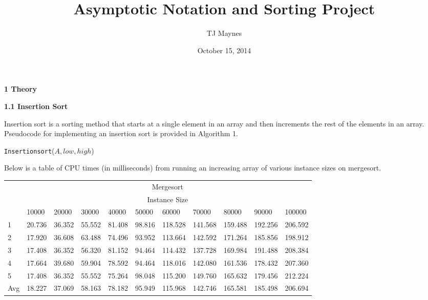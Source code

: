 \documentclass[12pt]{article}
\begin{document}
\title{Asymptotic Notation and Sorting Project}
\author{TJ Maynes}
\date{October 15, 2014}

\maketitle

\textbf{1 Theory}

\vspace{0.2in}
\textbf{1.1 Insertion Sort}

Insertion sort is a sorting method that starts at a single element in an array and then increments the rest of the elements in an array. Pseudocode for implementing an insertion sort is provided in Algorithm 1.

\begin{algorithm}
  \caption{\texttt{Insertionsort}($A,low,high$)}
\end{algorithm}

Below is a table of CPU times (in milliseconds) from running an increasing array of various instance sizes on mergesort. \\

\begin{table}[H]
  \begin{tabular}{lllllllllll}
    & \multicolumn{10}{c}{Mergesort}                                                               \\
    & \multicolumn{10}{c}{Instance Size}                                                           \\
    & 10000  & 20000  & 30000  & 40000  & 50000  & 60000   & 70000   & 80000   & 90000   & 100000  \\
    1   & 20.736 & 36.352 & 55.552 & 81.408 & 98.816 & 118.528 & 141.568 & 159.488 & 192.256 & 206.592 \\
    2   & 17.920 & 36.608 & 63.488 & 74.496 & 93.952 & 113.664 & 142.592 & 171.264 & 185.856 & 198.912 \\
    3   & 17.408 & 36.352 & 56.320 & 81.152 & 94.464 & 114.432 & 137.728 & 169.984 & 191.488 & 208.384 \\
    4   & 17.664 & 39.680 & 59.904 & 78.592 & 94.464 & 118.016 & 142.080 & 161.536 & 178.432 & 207.360 \\
    5   & 17.408 & 36.352 & 55.552 & 75.264 & 98.048 & 115.200 & 149.760 & 165.632 & 179.456 & 212.224 \\
    Avg & 18.227 & 37.069 & 58.163 & 78.182 & 95.949 & 115.968 & 142.746 & 165.581 & 185.498 & 206.694
  \end{tabular}
  \end{table}

\end{document}

